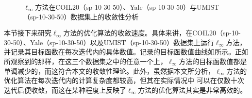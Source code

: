 \begin{figure}[!t]
    \centering
    \caption{$\ell_{\infty}$方法在COIL20（sp-10-30-50）、Yale（sp-10-30-50）与UMIST（sp-10-30-50）数据集上的收敛性分析}
    \label{fig:conv}
\end{figure}

本节接下来研究$\ell_{\infty}$方法的优化算法的收敛速度。具体来讲，在COIL20（sp-10-30-50）、Yale（sp-10-30-50）以及UMIST（sp-10-30-50）数据集上运行$\ell_{\infty}$方法，并记录其目标函数在每次迭代内的具体数值。记录的目标函数值曲线如所示。正如所观察到的那样，在这三个数据集之中的任意一个上，$\ell_{\infty}$方法的目标函数值都是单调减少的，而这符合本文的收敛性理论。此外，虽然据本文所分析，$\ell_{\infty}$方法的优化算法在每次迭代内的计算复杂度都较高，但其在实际情况中
可以在仅数十次迭代后便收敛，而这在某种程度上反映了$\ell_{\infty}$方法的优化算法其实是非常高效的。


